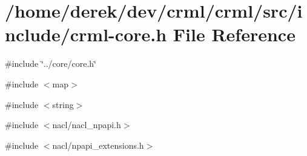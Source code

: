 \hypertarget{crml-core_8h}{
\section{/home/derek/dev/crml/crml/src/include/crml-\/core.h File Reference}
\label{crml-core_8h}
}
{\ttfamily \#include \char`\"{}../core/core.h\char`\"{}}\par
{\ttfamily \#include $<$map$>$}\par
{\ttfamily \#include $<$string$>$}\par
{\ttfamily \#include $<$nacl/nacl\_\-npapi.h$>$}\par
{\ttfamily \#include $<$nacl/npapi\_\-extensions.h$>$}\par
